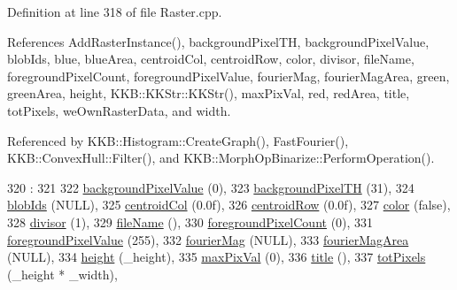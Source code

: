 Definition at line 318 of file Raster.\+cpp.



References Add\+Raster\+Instance(), background\+Pixel\+TH, background\+Pixel\+Value, blob\+Ids, blue, blue\+Area, centroid\+Col, centroid\+Row, color, divisor, file\+Name, foreground\+Pixel\+Count, foreground\+Pixel\+Value, fourier\+Mag, fourier\+Mag\+Area, green, green\+Area, height, K\+K\+B\+::\+K\+K\+Str\+::\+K\+K\+Str(), max\+Pix\+Val, red, red\+Area, title, tot\+Pixels, we\+Own\+Raster\+Data, and width.



Referenced by K\+K\+B\+::\+Histogram\+::\+Create\+Graph(), Fast\+Fourier(), K\+K\+B\+::\+Convex\+Hull\+::\+Filter(), and K\+K\+B\+::\+Morph\+Op\+Binarize\+::\+Perform\+Operation().


\begin{DoxyCode}
320                 :
321 
322   \hyperlink{class_k_k_b_1_1_raster_ab7ed2191cce116a6a37029dc6e3713ef}{backgroundPixelValue} (0),
323   \hyperlink{class_k_k_b_1_1_raster_a3c4e96eaf48274f5d8912617f81f2a0b}{backgroundPixelTH}    (31),
324   \hyperlink{class_k_k_b_1_1_raster_a0fc9a1588e809db0b701f0a886bfd18c}{blobIds}              (NULL),
325   \hyperlink{class_k_k_b_1_1_raster_ac4cb3984d20f6eef6fd4f201681ea1d5}{centroidCol}          (0.0f),
326   \hyperlink{class_k_k_b_1_1_raster_a3380e5734ec57a147e36c734cc83c5ff}{centroidRow}          (0.0f),
327   \hyperlink{class_k_k_b_1_1_raster_a482384d89cc53fa4f36276307c746854}{color}                (\textcolor{keyword}{false}),
328   \hyperlink{class_k_k_b_1_1_raster_afaaaf54fd824a4a47fba97f7fba9398f}{divisor}              (1),
329   \hyperlink{class_k_k_b_1_1_raster_a742e1da027493443f2dda570a89fe2e9}{fileName}             (),
330   \hyperlink{class_k_k_b_1_1_raster_aa7e86253f4b9c347da718732e44b60e8}{foregroundPixelCount} (0),
331   \hyperlink{class_k_k_b_1_1_raster_ac9a5cec097e9fed669fe3c44bcc1678c}{foregroundPixelValue} (255),
332   \hyperlink{class_k_k_b_1_1_raster_a16d18df2f29a49c7a8ee670e0ea0c3a9}{fourierMag}           (NULL),
333   \hyperlink{class_k_k_b_1_1_raster_adc50969a106f5b57aca3a9ce512df0ce}{fourierMagArea}       (NULL),
334   \hyperlink{class_k_k_b_1_1_raster_af39ff189de4fbb6de98392e187efafb7}{height}               (\_height),
335   \hyperlink{class_k_k_b_1_1_raster_a4f37d3b83826f522f61af0918a1d5546}{maxPixVal}            (0),
336   \hyperlink{class_k_k_b_1_1_raster_a2dc74728363b538563b6626422651236}{title}                (),
337   \hyperlink{class_k_k_b_1_1_raster_a9b08c4a0ca0a35435a478599635f1dc0}{totPixels}            (\_height * \_width),

\end{DoxyCode}
